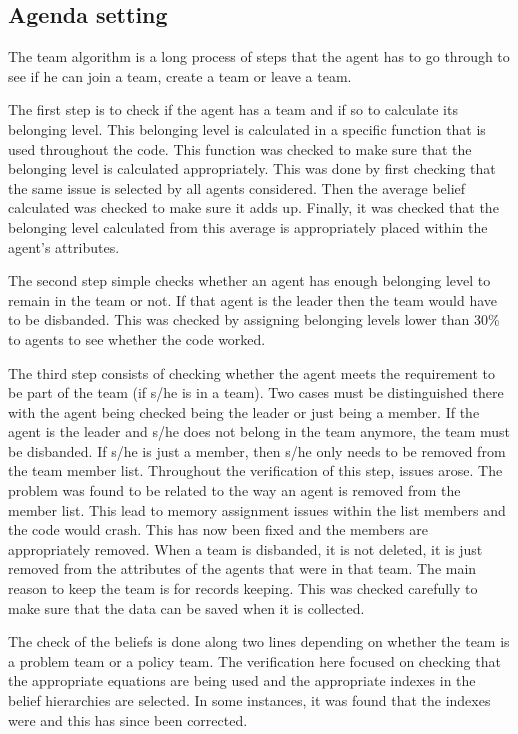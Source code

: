 \subsection{Agenda setting}

The team algorithm is a long process of steps that the agent has to go through to see if he can join a team, create a team or leave a team. 

The first step is to check if the agent has a team and if so to calculate its belonging level. This belonging level is calculated in a specific function that is used throughout the code. This function was checked to make sure that the belonging level is calculated appropriately. This was done by first checking that the same issue is selected by all agents considered. Then the average belief calculated was checked to make sure it adds up. Finally, it was checked that the belonging level calculated from this average is appropriately placed within the agent’s attributes.

The second step simple checks whether an agent has enough belonging level to remain in the team or not. If that agent is the leader then the team would have to be disbanded. This was checked by assigning belonging levels lower than 30\% to agents to see whether the code worked.

The third step consists of checking whether the agent meets the requirement to be part of the team (if s/he is in a team). Two cases must be distinguished there with the agent being checked being the leader or just being a member. If the agent is the leader and s/he does not belong in the team anymore, the team must be disbanded. If s/he is just a member, then s/he only needs to be removed from the team member list. Throughout the verification of this step, issues arose. The problem was found to be related to the way an agent is removed from the member list. This lead to memory assignment issues within the list members and the code would crash. This has now been fixed and the members are appropriately removed. When a team is disbanded, it is not deleted, it is just removed from the attributes of the agents that were in that team. The main reason to keep the team is for records keeping. This was checked carefully to make sure that the data can be saved when it is collected.

The check of the beliefs is done along two lines depending on whether the team is a problem team or a policy team. The verification here focused on checking that the appropriate equations are being used and the appropriate indexes in the belief hierarchies are selected. In some instances, it was found that the indexes were and this has since been corrected.

